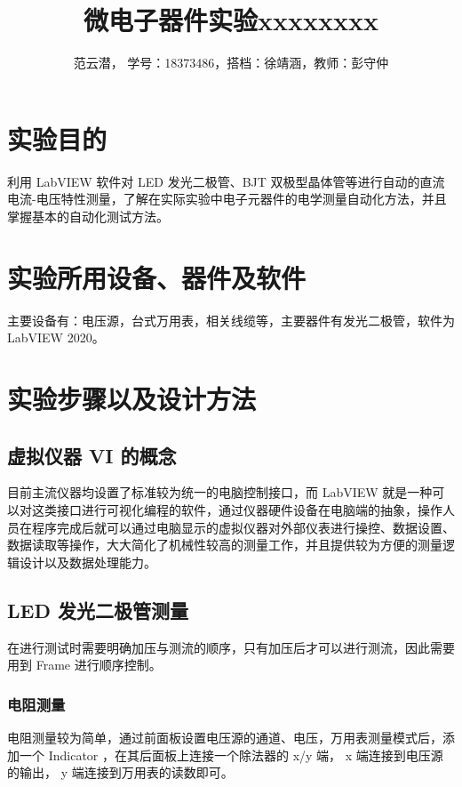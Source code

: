 \documentclass[lang=cn,11pt,a4paper,cite=authoryear]{elegantpaper}
\title{微电子器件实验\quad xxxxxxxx}
\author{范云潜， 学号：18373486，搭档：徐靖涵，教师：彭守仲}
\institute{微电子学院 184111 班}
\date{\zhtoday}
\begin{document}
\maketitle


\section{实验目的}

利用 LabVIEW 软件对 LED 发光二极管、BJT 双极型晶体管等进行自动的直流电流-电压特性测量，了解在实际实验中电子元器件的电学测量自动化方法，并且掌握基本的自动化测试方法。

\section{实验所用设备、器件及软件}


主要设备有：电压源，台式万用表，相关线缆等，主要器件有发光二极管，软件为 LabVIEW 2020。

\section{实验步骤以及设计方法}

\subsection{虚拟仪器 VI 的概念}

目前主流仪器均设置了标准较为统一的电脑控制接口，而 LabVIEW 就是一种可以对这类接口进行可视化编程的软件，通过仪器硬件设备在电脑端的抽象，操作人员在程序完成后就可以通过电脑显示的虚拟仪器对外部仪表进行操控、数据设置、数据读取等操作，大大简化了机械性较高的测量工作，并且提供较为方便的测量逻辑设计以及数据处理能力。

\subsection{LED 发光二极管测量}

在进行测试时需要明确加压与测流的顺序，只有加压后才可以进行测流，因此需要用到 Frame 进行顺序控制。 

\subsubsection{电阻测量}

电阻测量较为简单，通过前面板设置电压源的通道、电压，万用表测量模式后，添加一个 Indicator ，在其后面板上连接一个除法器的 x/y 端， x 端连接到电压源的输出， y 端连接到万用表的读数即可。
\end{document}
